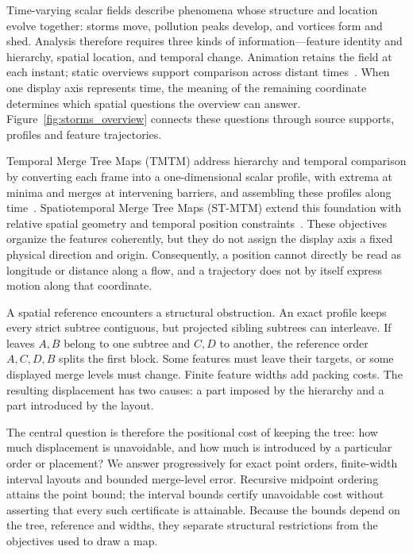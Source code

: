 \maketitle
\raggedbottom
\setlength{\emergencystretch}{1.5em}
Time-varying scalar fields describe phenomena whose structure and location evolve together: storms move, pollution peaks develop, and vortices form and shed. Analysis therefore requires three kinds of information---feature identity and hierarchy, spatial location, and temporal change. Animation retains the field at each instant; static overviews support comparison across distant times~\cite{Tversky:2002:Animation,Robertson:2008:Animation,Bach:2017:STC}. When one display axis represents time, the meaning of the remaining coordinate determines which spatial questions the overview can answer. Figure~\ref{fig:storms_overview} connects these questions through source supports, profiles and feature trajectories.

Temporal Merge Tree Maps (TMTM) address hierarchy and temporal comparison by converting each frame into a one-dimensional scalar profile, with extrema at minima and merges at intervening barriers, and assembling these profiles along time~\cite{Koepp:2023:TMTM}. Spatiotemporal Merge Tree Maps (ST-MTM) extend this foundation with relative spatial geometry and temporal position constraints~\cite{STMTM:2026}. These objectives organize the features coherently, but they do not assign the display axis a fixed physical direction and origin. Consequently, a position cannot directly be read as longitude or distance along a flow, and a trajectory does not by itself express motion along that coordinate.

A spatial reference encounters a structural obstruction. An exact profile keeps every strict subtree contiguous, but projected sibling subtrees can interleave. If leaves $A,B$ belong to one subtree and $C,D$ to another, the reference order $A,C,D,B$ splits the first block. Some features must leave their targets, or some displayed merge levels must change. Finite feature widths add packing costs. The resulting displacement has two causes: a part imposed by the hierarchy and a part introduced by the layout.

The central question is therefore the positional cost of keeping the tree: how much displacement is unavoidable, and how much is introduced by a particular order or placement? We answer progressively for exact point orders, finite-width interval layouts and bounded merge-level error. Recursive midpoint ordering attains the point bound; the interval bounds certify unavoidable cost without asserting that every such certificate is attainable. Because the bounds depend on the tree, reference and widths, they separate structural restrictions from the objectives used to draw a map.

